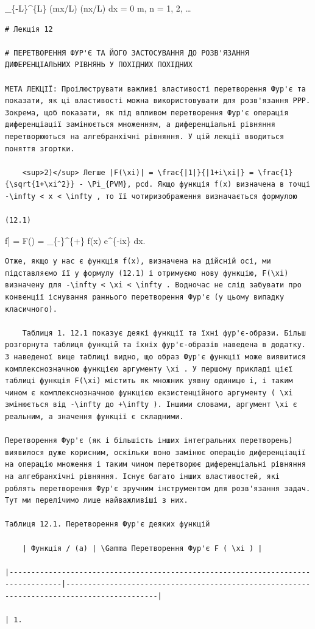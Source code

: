 \documentclass[
  ukrainian,
]{article}
\begin{document}
\int\_\{-L\}\^{}\{L\} \sin(m\pi x/L) \cos(n\pi x/L) dx = 0
 m, n = 1, 2, \dots

\begin{verbatim}
# Лекція 12

# ПЕРЕТВОРЕННЯ ФУР'Є ТА ЙОГО ЗАСТОСУВАННЯ ДО РОЗВ'ЯЗАННЯ ДИФЕРЕНЦІАЛЬНИХ РІВНЯНЬ У ПОХІДНИХ ПОХІДНИХ

МЕТА ЛЕКЦІЇ: Проілюструвати важливі властивості перетворення Фур'є та показати, як ці властивості можна використовувати для розв'язання PPP. Зокрема, щоб показати, як під впливом перетворення Фур'є операція диференціації замінюється множенням, а диференціальні рівняння перетворюються на алгебранхічні рівняння. У цій лекції вводиться поняття згортки.

    <sup>2)</sup> Легше |F(\xi)| = \frac{|1|}{|1+i\xi|} = \frac{1}{\sqrt{1+\xi^2}} - \Pi_{PVM}, pcd. Якщо функція f(x) визначена в точці -\infty < x < \infty , то її чотиризображення визначається формулою

(12.1)
\end{verbatim}

\mathcal{F}{[}f{]} = F(\xi) = 
\int\_\{-\infty\}\^{}\{+\infty\} f(x) e\^{}\{-i\xi x\} dx.

\begin{verbatim}
Отже, якщо у нас є функція f(x), визначена на дійсній осі, ми підставляємо її у формулу (12.1) і отримуємо нову функцію, F(\xi) визначену для -\infty < \xi < \infty . Водночас не слід забувати про конвенції існування раннього перетворення Фур'є (у цьому випадку класичного).

    Таблиця 1. 12.1 показує деякі функції та їхні фур'є-образи. Більш розгорнута таблиця функцій та їхніх фур'є-образів наведена в додатку. З наведеної вище таблиці видно, що образ Фур'є функції може виявитися комплекснозначною функцією аргументу \xi . У першому прикладі цієї таблиці функція F(\xi) містить як множник уявну одиницю i, і таким чином є комплекснозначною функцією екзистенційного аргументу ( \xi змінюється від -\infty до +\infty ). Іншими словами, аргумент \xi є реальним, а значення функції є складними.

Перетворення Фур'є (як і більшість інших інтегральних перетворень) виявилося дуже корисним, оскільки воно замінює операцію диференціації на операцію множення і таким чином перетворює диференціальні рівняння на алгебранхічні рівняння. Існує багато інших властивостей, які роблять перетворення Фур'є зручним інструментом для розв'язання задач. Тут ми перелічимо лише найважливіші з них.

Таблиця 12.1. Перетворення Фур'є деяких функцій

    | Функція / (a) | \Gamma Перетворення Фур'є F ( \xi ) |

|----------------------------------------------------------------------------------|-------------------------------------------------------------------------------------------|

| 1.
\end{verbatim}
\end{document}
